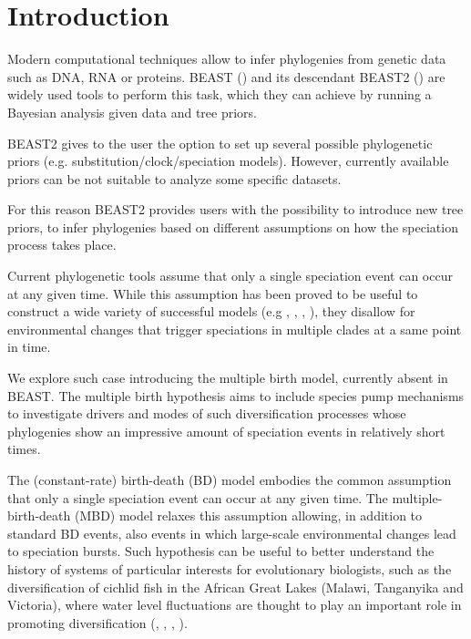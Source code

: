 \section{Introduction}

Modern computational techniques allow to infer phylogenies from genetic data such as DNA, RNA or proteins. BEAST (\cite{beast}) and its descendant BEAST2 (\cite{beast2}) are widely used tools to perform this task, which they can achieve by running a Bayesian analysis given data and tree priors.

BEAST2 gives to the user the option to set up several possible phylogenetic priors (e.g. substitution/clock/speciation models). However, currently available priors can be not suitable to analyze some specific datasets.

For this reason BEAST2 provides users with the possibility to introduce new tree priors, to infer phylogenies based on different assumptions on how the speciation process takes place.

Current phylogenetic tools assume that only a single speciation event can occur at any given time.
While this assumption has been proved to be useful to construct a wide variety of successful models (e.g \cite{Maddison2007biSSE}, \cite{Valente2015}, \cite{etienne2012diversity}, \cite{etienne2014estimating}), they disallow for environmental changes that trigger speciations in multiple clades at a same point in time. 

We explore such case introducing the multiple birth model, currently absent in BEAST. The multiple birth hypothesis aims to include species pump mechanisms to investigate drivers and modes of such diversification processes whose phylogenies show an impressive amount of speciation events in relatively short times.

The (constant-rate) birth-death (BD) model embodies the common assumption that only a single speciation event can occur at any given time.
The multiple-birth-death (MBD) model relaxes this assumption allowing, in addition to standard BD events, also events in which large-scale environmental changes lead to speciation bursts.
Such hypothesis can be useful to better understand the history of systems of particular interests for evolutionary biologists, such as the  diversification of cichlid fish in the African Great Lakes (Malawi, Tanganyika and Victoria), where water level fluctuations are thought to play an important role in promoting diversification (\citep{verheyen1996mitochondrial}, \citep{sturmbauer2001lake}, \citep{janzen2016}, \citep{janzen2017}).


